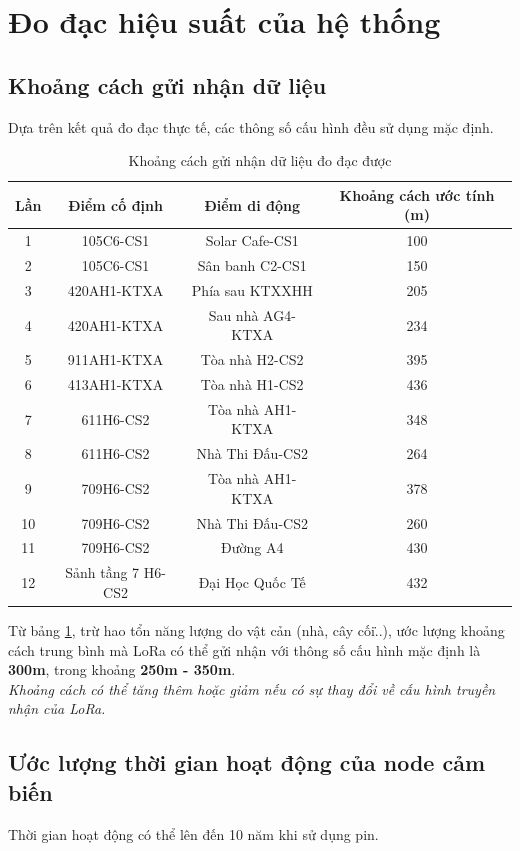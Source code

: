 \section{Đo đạc hiệu suất của hệ thống}
%
%
\subsection{Khoảng cách gửi nhận dữ liệu}
Dựa trên kết quả đo đạc thực tế, các thông số cấu hình đều sử dụng mặc định.
\begin{center}
\begin{table}[!h]
\begin{center}
\begin{tabular}{|c|c|c|c|}
\hline
\textbf{Lần} & \textbf{Điểm cố định} & \textbf{Điểm di động} & \textbf{Khoảng cách ước tính (m)}\\ 
\hline
1 & 105C6-CS1 & Solar Cafe-CS1 & 100\\
\hline
2 & 105C6-CS1 & Sân banh C2-CS1 & 150\\
\hline
3 & 420AH1-KTXA & Phía sau KTXXHH & 205\\
\hline
4 & 420AH1-KTXA & Sau nhà AG4-KTXA & 234\\
\hline
5 & 911AH1-KTXA & Tòa nhà H2-CS2 & 395\\
\hline
6 & 413AH1-KTXA & Tòa nhà H1-CS2 & 436\\
\hline
7 & 611H6-CS2 & Tòa nhà AH1-KTXA & 348\\
\hline
8 & 611H6-CS2 & Nhà Thi Đấu-CS2 & 264\\
\hline
9 & 709H6-CS2 & Tòa nhà AH1-KTXA & 378\\
\hline
10 & 709H6-CS2 & Nhà Thi Đấu-CS2 & 260\\
\hline
11 & 709H6-CS2 & Đường A4 & 430\\
\hline
12 & Sảnh tầng 7 H6-CS2 & Đại Học Quốc Tế & 432\\
\hline
\end{tabular}
\caption{Khoảng cách gửi nhận dữ liệu đo đạc được}
\label{dislora}
\end{center}
\end{table}
\end{center}
Từ bảng \ref{dislora}, trừ hao tổn năng lượng do vật cản (nhà, cây cối\...), ước lượng khoảng cách trung bình mà LoRa có thể gửi nhận với thông số cấu hình mặc định là \textbf{300m}, trong khoảng \textbf{250m - 350m}.\\
\textit{Khoảng cách có thể tăng thêm hoặc giảm nếu có sự thay đổi về cấu hình truyền nhận của LoRa.}
\subsection{Ước lượng thời gian hoạt động của node cảm biến}
Thời gian hoạt động có thể lên đến 10 năm khi sử dụng pin. \cite{tl18}